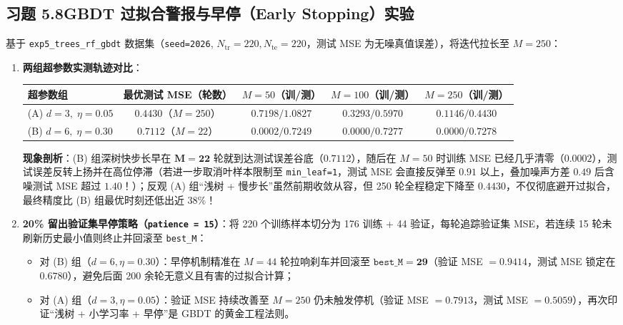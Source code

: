 \subsection*{习题 5.8\quad GBDT 过拟合警报与早停（Early Stopping）实验}
基于 \texttt{exp5\_trees\_rf\_gbdt} 数据集（\texttt{seed=2026}, $N_{\mathrm{tr}}=220, N_{\mathrm{te}}=220$，测试 MSE 为无噪真值误差），将迭代拉长至 $M = 250$：
\begin{enumerate}[label=(\arabic*), leftmargin=1.8em]
  \item \textbf{两组超参数实测轨迹对比}：
  \begin{center}\footnotesize\setlength{\tabcolsep}{4pt}
  \begin{tabular}{@{}lcccc@{}}
    \toprule
    \textbf{超参数组} & 最优测试 MSE（轮数） & $M=50$（训/测） & $M=100$（训/测） & $M=250$（训/测） \\
    \midrule
    (A) $d=3,\; \eta=0.05$ & $\mathbf{0.4430}$（$M=250$） & $0.7198 / 1.0827$ & $0.3293 / 0.5970$ & $0.1146 / \mathbf{0.4430}$ \\
    (B) $d=6,\; \eta=0.30$ & $0.7112$（$M=22$） & $0.0002 / 0.7249$ & $0.0000 / 0.7277$ & $0.0000 / 0.7278$ \\
    \bottomrule
  \end{tabular}
  \end{center}
  \textbf{现象剖析}：(B) 组深树快步长早在 $\mathbf{M = 22}$ 轮就到达测试误差谷底（$0.7112$），随后在 $M = 50$ 时训练 MSE 已经几乎清零（$0.0002$），测试误差反转上扬并在高位停滞（若进一步取消叶样本限制至 \texttt{min\_leaf=1}，测试 MSE 会直接反弹至 $0.91$ 以上，叠加噪声方差 $0.49$ 后含噪测试 MSE 超过 $1.40$！）；反观 (A) 组“浅树 + 慢步长”虽然前期收敛从容，但 250 轮全程稳定下降至 $\mathbf{0.4430}$，不仅彻底避开过拟合，最终精度比 (B) 组最优时刻还低出近 $38\%$！

  \item \textbf{20\% 留出验证集早停策略（\texttt{patience = 15}）}：将 220 个训练样本切分为 176 训练 + 44 验证，每轮追踪验证集 MSE，若连续 15 轮未刷新历史最小值则终止并回滚至 \texttt{best\_M}：
  \begin{itemize}
    \item 对 (B) 组（$d=6, \eta=0.30$）：早停机制精准在 $M = 44$ 轮拉响刹车并回滚至 $\mathbf{\texttt{best\_M} = 29}$（验证 MSE $= 0.9414$，测试 MSE 锁定在 $0.6780$），避免后面 200 余轮无意义且有害的过拟合计算；
    \item 对 (A) 组（$d=3, \eta=0.05$）：验证 MSE 持续改善至 $M = 250$ 仍未触发停机（验证 MSE $= 0.7913$，测试 MSE $= 0.5059$），再次印证“浅树 + 小学习率 + 早停”是 GBDT 的黄金工程法则。
  \end{itemize}
\end{enumerate}

